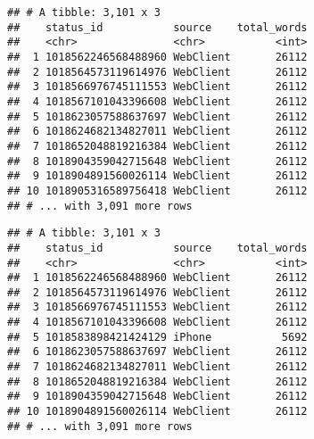 \documentclass[]{article}
\newenvironment{Shaded}{\begin{snugshade}}{\end{snugshade}}
\newcommand{\DataTypeTok}[1]{\textcolor[rgb]{0.13,0.29,0.53}{#1}}
\newcommand{\KeywordTok}[1]{\textcolor[rgb]{0.13,0.29,0.53}{\textbf{#1}}}
\newcommand{\NormalTok}[1]{#1}
\newcommand{\OperatorTok}[1]{\textcolor[rgb]{0.81,0.36,0.00}{\textbf{#1}}}
\newcommand{\StringTok}[1]{\textcolor[rgb]{0.31,0.60,0.02}{#1}}
\begin{document}
\begin{verbatim}
## # A tibble: 3,101 x 3
##    status_id           source    total_words
##    <chr>               <chr>           <int>
##  1 1018562246568488960 WebClient       26112
##  2 1018564573119614976 WebClient       26112
##  3 1018566976745111553 WebClient       26112
##  4 1018567101043396608 WebClient       26112
##  5 1018623057588637697 WebClient       26112
##  6 1018624682134827011 WebClient       26112
##  7 1018652048819216384 WebClient       26112
##  8 1018904359042715648 WebClient       26112
##  9 1018904891560026114 WebClient       26112
## 10 1018905316589756418 WebClient       26112
## # ... with 3,091 more rows
\end{verbatim}

\begin{Shaded}
\end{Shaded}

\begin{verbatim}
## # A tibble: 3,101 x 3
##    status_id           source    total_words
##    <chr>               <chr>           <int>
##  1 1018562246568488960 WebClient       26112
##  2 1018564573119614976 WebClient       26112
##  3 1018566976745111553 WebClient       26112
##  4 1018567101043396608 WebClient       26112
##  5 1018583898421424129 iPhone           5692
##  6 1018623057588637697 WebClient       26112
##  7 1018624682134827011 WebClient       26112
##  8 1018652048819216384 WebClient       26112
##  9 1018904359042715648 WebClient       26112
## 10 1018904891560026114 WebClient       26112
## # ... with 3,091 more rows
\end{verbatim}
\end{document}
